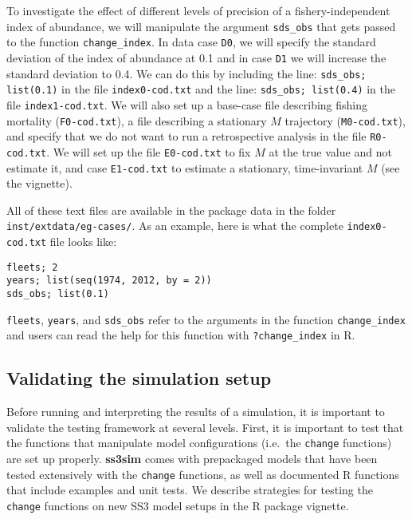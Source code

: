 \documentclass[10pt]{article}
\begin{document}
To investigate the effect of different levels of precision of a
fishery-independent index of abundance, we will manipulate the argument
\texttt{sds\_obs} that gets passed to the function \texttt{change\_index}. In
data case \texttt{D0}, we will specify the standard deviation of the index of
abundance at 0.1 and in case \texttt{D1} we will increase the standard
deviation to 0.4. We can do this by including the line: \texttt{sds\_obs;
  list(0.1)} in the file \texttt{index0-cod.txt} and the line:
\texttt{sds\_obs; list(0.4)} in the file \texttt{index1-cod.txt}. We will also
set up a base-case file describing fishing mortality (\texttt{F0-cod.txt}), a
file describing a stationary $M$ trajectory (\texttt{M0-cod.txt}), and specify
that we do not want to run a retrospective analysis in the file
\texttt{R0-cod.txt}. We will set up the file \texttt{E0-cod.txt} to fix $M$ at
the true value and not estimate it, and case \texttt{E1-cod.txt} to estimate a
stationary, time-invariant $M$ (see the vignette).

All of these text files are available in the package data in the folder
\texttt{inst/extdata/eg-cases/}. As an example, here is what the complete
\texttt{index0-cod.txt} file looks like:

\begin{verbatim}
fleets; 2
years; list(seq(1974, 2012, by = 2))
sds_obs; list(0.1)
\end{verbatim}

\noindent
\texttt{fleets}, \texttt{years}, and \texttt{sds\_obs} refer to the arguments
in the function \texttt{change\_index} and users can read the help for this
function with \texttt{?change\_index} in \textsf{R}.

\subsection*{Validating the simulation setup}

Before running and interpreting the results of a simulation, it is
important to validate the testing framework at several levels. First, it is
important to test that the functions that manipulate model configurations
(i.e.~the \texttt{change} functions) are set up properly. \textbf{ss3sim} comes
with prepackaged models that have been tested extensively with the
\texttt{change} functions, as well as documented \textsf{R} functions that
include examples and unit tests. We describe strategies for testing the
\texttt{change} functions on new SS3 model setups in the \textsf{R} package vignette.
\end{document}
